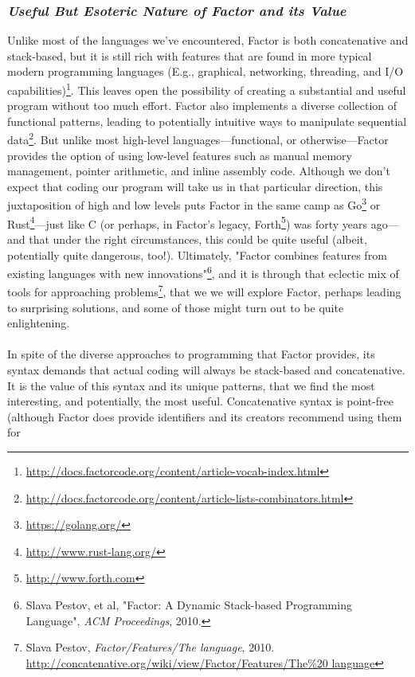 \documentclass{sig-alternate}
\begin{document}
\subsubsection*{\textit{Useful But Esoteric Nature of Factor and its Value}}
Unlike most of the languages we've encountered, Factor is both concatenative and stack-based, but it is still rich with
features that are found in more typical modern programming languages
(E.g., graphical, networking, threading, and I/O capabilities)\footnote{\url{http://docs.factorcode.org/content/article-vocab-index.html}}. This
leaves open the possibility of creating a substantial and useful
program without too much effort. Factor also implements a diverse
collection of functional patterns, leading to potentially intuitive ways to manipulate sequential data\footnote{\url{http://docs.factorcode.org/content/article-lists-combinators.html}}. But unlike most high-level languages---functional, or otherwise---Factor provides the option of using low-level
 features such as manual memory management, pointer arithmetic,
and inline assembly code. Although we don't expect that coding our
program will take us in that particular direction, this
juxtaposition of high and low levels puts Factor in the same camp as Go\footnote{\url{https://golang.org/}} or Rust\footnote{\url{http://www.rust-lang.org/}}---just like C (or perhaps, in Factor's legacy, Forth\footnote{\url{http://www.forth.com}}) was forty years ago---and that under the right circumstances, this could be
quite useful (albeit, potentially quite dangerous, too!).  Ultimately, "Factor combines features from existing languages with new
innovations"\footnote{Slava Pestov, et al, "Factor: A Dynamic Stack-based Programming Language", \textit{ACM Proceedings}, 2010.}, and it is through that eclectic mix of tools for approaching problems\footnote{Slava Pestov, \textit{Factor/Features/The language}, 2010. \url{http://concatenative.org/wiki/view/Factor/Features/The\%20 language}}, that we we will explore Factor, perhaps leading to surprising solutions, and some of those might turn out to be quite enlightening.
\\\\
In spite of the diverse approaches to programming that Factor
provides, its syntax demands that actual coding will always be stack-based
 and concatenative. It is the value of this syntax and its unique
patterns, that we find the most interesting, and potentially, the most
useful. Concatenative syntax is point-free (although Factor does
provide identifiers and its creators recommend using them for
\end{document}

